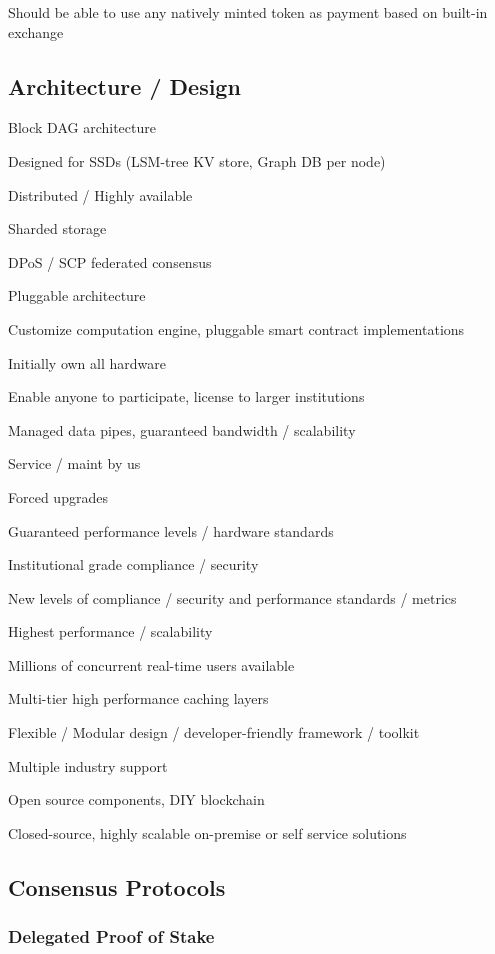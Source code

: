 \documentclass[11pt]{article}
\begin{document}
Should be able to use any natively minted token as payment based on built-in exchange


\subsection{Architecture / Design}

Block DAG architecture


Designed for SSDs (LSM-tree KV store, Graph DB per node)


Distributed / Highly available


Sharded storage


DPoS / SCP federated consensus


Pluggable architecture


Customize computation engine, pluggable smart contract implementations


Initially own all hardware


Enable anyone to participate, license to larger institutions


Managed data pipes, guaranteed bandwidth / scalability


Service / maint by us


Forced upgrades


Guaranteed performance levels / hardware standards


Institutional grade compliance / security


New levels of compliance / security and performance standards / metrics


Highest performance / scalability


Millions of concurrent real-time users available


Multi-tier high performance caching layers


Flexible / Modular design / developer-friendly framework / toolkit


Multiple industry support


Open source components, DIY blockchain


Closed-source, highly scalable on-premise or self service solutions


\subsection{Consensus Protocols}

\subsubsection{Delegated Proof of Stake}
\end{document}
